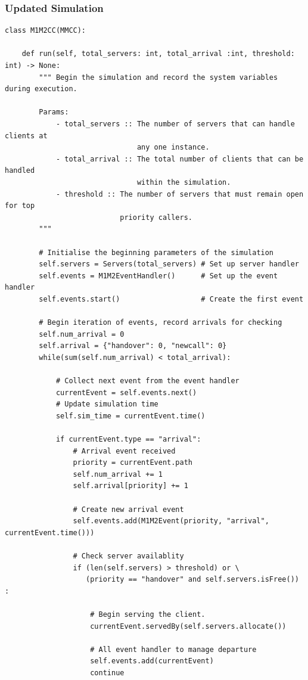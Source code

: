 \documentclass{ecmm427_assignment}
\begin{document}
\subsubsection{Updated Simulation}
\begin{verbatim}
class M1M2CC(MMCC):

    def run(self, total_servers: int, total_arrival :int, threshold: int) -> None:
        """ Begin the simulation and record the system variables during execution.

        Params:
            - total_servers :: The number of servers that can handle clients at 
                               any one instance.
            - total_arrival :: The total number of clients that can be handled 
                               within the simulation.
            - threshold :: The number of servers that must remain open for top 
                           priority callers.
        """

        # Initialise the beginning parameters of the simulation
        self.servers = Servers(total_servers) # Set up server handler
        self.events = M1M2EventHandler()      # Set up the event handler
        self.events.start()                   # Create the first event

        # Begin iteration of events, record arrivals for checking
        self.num_arrival = 0
        self.arrival = {"handover": 0, "newcall": 0}
        while(sum(self.num_arrival) < total_arrival):

            # Collect next event from the event handler
            currentEvent = self.events.next()
            # Update simulation time
            self.sim_time = currentEvent.time()

            if currentEvent.type == "arrival":
                # Arrival event received
                priority = currentEvent.path
                self.num_arrival += 1
                self.arrival[priority] += 1

                # Create new arrival event
                self.events.add(M1M2Event(priority, "arrival", currentEvent.time()))

                # Check server availablity
                if (len(self.servers) > threshold) or \
                   (priority == "handover" and self.servers.isFree()) :
                    
                    # Begin serving the client.
                    currentEvent.servedBy(self.servers.allocate())

                    # All event handler to manage departure
                    self.events.add(currentEvent)
                    continue
                

\end{verbatim}
\end{document}
